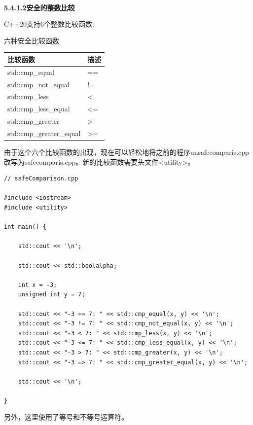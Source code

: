 \hspace*{\fill} \\ %
\noindent
\textbf{5.4.1.2\hspace{0.2cm}安全的整数比较}

C++20支持6个整数比较函数:

\begin{center}
六种安全比较函数
\end{center}

\begin{table}[H]
\centering
\begin{tabular}{ll}
\textbf{比较函数} & \textbf{描述} \\ \hline
std::cmp\_equal           & ==               \\
std::cmp\_not\_equal      & !=               \\
std::cmp\_less            & \textless{}      \\
std::cmp\_less\_equal     & \textless{}=     \\
std::cmp\_greater         & \textgreater{}   \\
std::cmp\_greater\_equal  & \textgreater{}= 
\end{tabular}
\end{table}

由于这个六个比较函数的出现，现在可以轻松地将之前的程序unsafecomparis.cpp改写为safecomparis.cpp。新的比较函数需要头文件<utility>。

\begin{lstlisting}[style=styleCXX]
// safeComparison.cpp

#include <iostream>
#include <utility>

int main() {
	
	std::cout << '\n';
	
	std::cout << std::boolalpha;
	
	int x = -3;
	unsigned int y = 7;
	
	std::cout << "-3 == 7: " << std::cmp_equal(x, y) << '\n';
	std::cout << "-3 != 7: " << std::cmp_not_equal(x, y) << '\n';
	std::cout << "-3 < 7: " << std::cmp_less(x, y) << '\n';
	std::cout << "-3 <= 7: " << std::cmp_less_equal(x, y) << '\n';
	std::cout << "-3 > 7: " << std::cmp_greater(x, y) << '\n';
	std::cout << "-3 => 7: " << std::cmp_greater_equal(x, y) << '\n';
	
	std::cout << '\n';
	
}
\end{lstlisting}

另外，这里使用了等号和不等号运算符。

